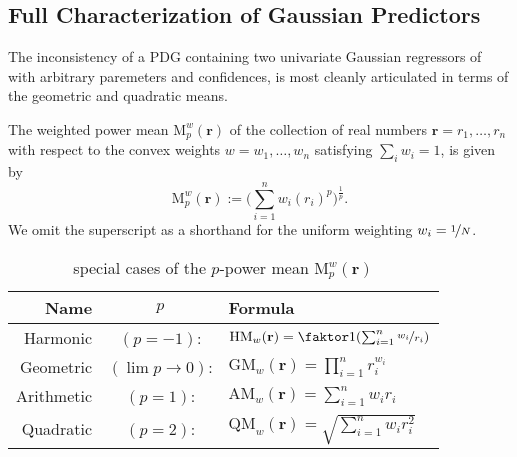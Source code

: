 \documentclass[twoside]{article}
\theoremstyle{plain}
\theoremstyle{definition}
\begin{document}
\subsection{Full Characterization of Gaussian Predictors}
The inconsistency of a PDG containing two univariate Gaussian regressors of with arbitrary paremeters and confidences, is most cleanly articulated in terms of the geometric and quadratic means.

\begin{defn}
	The weighted power mean $\mathrm M^w_p(\mathbf r)$ of the collection of real numbers $\mathbf r = r_1, \ldots, r_n$ with respect to the convex weights $w = w_1, \ldots, w_n$ satisfying $\sum_iw_i = 1$, is given by
	\[
		\mathrm M^w_p(\mathbf r) := \Big(\sum_{i=1}^n w_i (r_i)^p \Big)^{\frac1p}.
	\]
	We omit the superscript as a shorthand for the uniform weighting $w_i = \nicefrac{1}{N}$.
\end{defn}

\begin{table}
\centering
\renewcommand{\arraystretch}{1.5} %
\begin{tabular}{rcl}
	\textbf{Name} & $p$ & \textbf{Formula}\\\hline
	Harmonic&$(p=-1)$:& $\mathrm{HM}_w(\mathbf r) = \faktor1{\left(\sum_{i=1}^n \nicefrac{w_i}{r_i}\right)}$ \\
	Geometric&$(\lim {p\to 0})$:& $\mathrm{GM}_w(\mathbf r) = \prod_{i=1}^n r_i^{w_i}$ \\
	Arithmetic&$(p=1)$:& $\mathrm{AM}_w(\mathbf r) = \sum_{i=1}^n w_i r_i$ \\
	Quadratic&$(p=2)$:& $\mathrm{QM}_w(\mathbf r) = \sqrt{\textstyle\sum_{i=1}^n w_i r_i^2}$\\\hline
	\end{tabular}
	\caption{special cases of the $p$-power mean $\mathrm M_p^w(\mathbf r)$}
	\label{tab:power-means}
\end{table}
\end{document}
